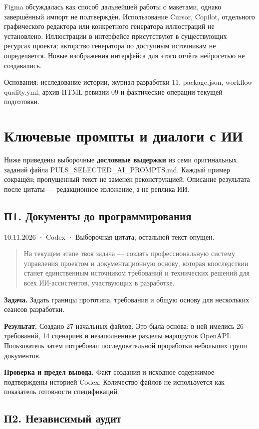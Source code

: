 \documentclass[11pt,a4paper]{article}
\newcommand{\source}[1]{{\small\color{muted}#1\par}}
\begin{document}
Figma обсуждалась как способ дальнейшей работы с макетами, однако завершённый импорт не подтверждён. Использование Cursor, Copilot, отдельного графического редактора или конкретного генератора иллюстраций не установлено. Иллюстрации в интерфейсе присутствуют в существующих ресурсах проекта; авторство генератора по доступным источникам не определяется. Новые изображения интерфейса для этого отчёта нейросетью не создавались.
\source{Основания: исследование истории, журнал разработки 11, package.json, workflow quality.yml, архив HTML-ревизии 09 и фактические операции текущей подготовки.}
\clearpage
\section{Ключевые промпты и диалоги с ИИ}
Ниже приведены выборочные \textbf{дословные выдержки} из семи оригинальных заданий файла PULS\_SELECTED\_AI\_PROMPTS.md. Каждый пример сокращён; пропущенный текст не заменён реконструкцией. Описание результата после цитаты — редакционное изложение, а не реплика ИИ.

\subsection{П1. Документы до программирования}

\source{10.11.2026 · Codex · Выборочная цитата; остальной текст опущен.}

\begin{quote}\small На текущем этапе твоя задача — создать профессиональную систему управления проектом и документационную основу, которая впоследствии станет единственным источником требований и технических решений для всех ИИ-ассистентов, участвующих в разработке.\end{quote}

\textbf{Задача.} Задать границы прототипа, требования и общую основу для нескольких сеансов разработки.


\textbf{Результат.} Создано 27 начальных файлов. Это была основа: в ней имелись 26 требований, 14 сценариев и незаполненные разделы маршрутов OpenAPI. Пользователь затем потребовал последовательной проработки небольших групп документов.


\textbf{Проверка и предел вывода.} Факт создания и исходное содержимое подтверждены историей Codex. Количество файлов не используется как показатель готовности спецификаций.


\subsection{П2. Независимый аудит}
\end{document}
